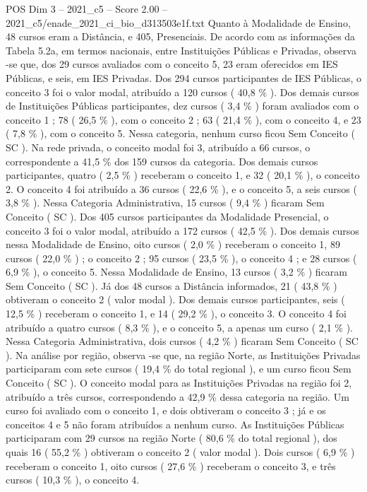 \begin{textsample}{POS Dim 3 – 2021\_c5 – Score 2.00 – 2021\_c5/enade\_2021\_ci\_bio\_d313503e1f.txt}
Quanto à Modalidade de Ensino, 48 cursos eram a Distância, e 405, Presenciais.
De acordo com as informações da Tabela 5.2a, em termos nacionais, entre Instituições Públicas e Privadas, observa -se que, dos 29 cursos avaliados com o conceito 5, 23 eram oferecidos em IES Públicas, e seis, em IES Privadas.
Dos 294 cursos participantes de IES Públicas, o conceito 3 foi o valor modal, atribuído a 120 cursos ( 40,8 \% ).
Dos demais cursos de Instituições Públicas participantes, dez cursos ( 3,4 \% ) foram avaliados com o conceito 1 ; 78 ( 26,5 \% ), com o conceito 2 ; 63 ( 21,4 \% ), com o conceito 4, e 23 ( 7,8 \% ), com o conceito 5.
Nessa categoria, nenhum curso ficou Sem Conceito ( SC ).
Na rede privada, o conceito modal foi 3, atribuído a 66 cursos, o correspondente a 41,5 \% dos 159 cursos da categoria.
Dos demais cursos participantes, quatro ( 2,5 \% ) receberam o conceito 1, e 32 ( 20,1 \% ), o conceito 2.
O conceito 4 foi atribuído a 36 cursos ( 22,6 \% ), e o conceito 5, a seis cursos ( 3,8 \% ).
Nessa Categoria Administrativa, 15 cursos ( 9,4 \% ) ficaram Sem Conceito ( SC ).
Dos 405 cursos participantes da Modalidade Presencial, o conceito 3 foi o valor modal, atribuído a 172 cursos ( 42,5 \% ).
Dos demais cursos nessa Modalidade de Ensino, oito cursos ( 2,0 \% ) receberam o conceito 1, 89 cursos ( 22,0 \% ) ; o conceito 2 ; 95 cursos ( 23,5 \% ), o conceito 4 ; e 28 cursos ( 6,9 \% ), o conceito 5.
Nessa Modalidade de Ensino, 13 cursos ( 3,2 \% ) ficaram Sem Conceito ( SC ).
Já dos 48 cursos a Distância informados, 21 ( 43,8 \% ) obtiveram o conceito 2 ( valor modal ).
Dos demais cursos participantes, seis ( 12,5 \% ) receberam o conceito 1, e 14 ( 29,2 \% ), o conceito 3.
O conceito 4 foi atribuído a quatro cursos ( 8,3 \% ), e o conceito 5, a apenas um curso ( 2,1 \% ).
Nessa Categoria Administrativa, dois cursos ( 4,2 \% ) ficaram Sem Conceito ( SC ).
Na análise por região, observa -se que, na região Norte, as Instituições Privadas participaram com sete cursos ( 19,4 \% do total regional ), e um curso ficou Sem Conceito ( SC ).
O conceito modal para as Instituições Privadas na região foi 2, atribuído a três cursos, correspondendo a 42,9 \% dessa categoria na região.
Um curso foi avaliado com o conceito 1, e dois obtiveram o conceito 3 ; já e os conceitos 4 e 5 não foram atribuídos a nenhum curso.
As Instituições Públicas participaram com 29 cursos na região Norte ( 80,6 \% do total regional ), dos quais 16 ( 55,2 \% ) obtiveram o conceito 2 ( valor modal ).
Dois cursos ( 6,9 \% ) receberam o conceito 1, oito cursos ( 27,6 \% ) receberam o conceito 3, e três cursos ( 10,3 \% ), o conceito 4.

\end{textsample}
